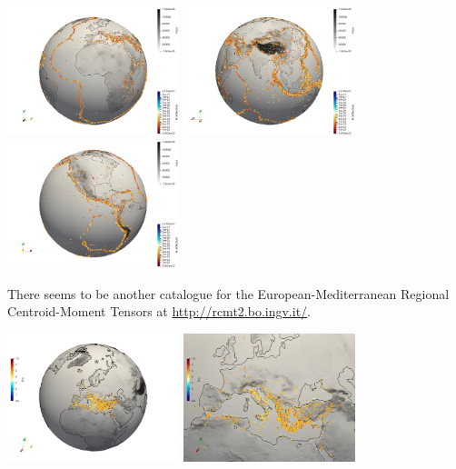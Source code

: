 \begin{center}
\includegraphics[width=5cm]{python_codes/fieldstone_134/images/visu1}
\includegraphics[width=5cm]{python_codes/fieldstone_134/images/visu2}
\includegraphics[width=5cm]{python_codes/fieldstone_134/images/visu3}
\end{center}


There seems to be another catalogue
for the European-Mediterranean Regional Centroid-Moment Tensors
at \url{http://rcmt2.bo.ingv.it/}.


\begin{center}
\includegraphics[width=5cm]{python_codes/fieldstone_134/images/visu5}
\includegraphics[width=5cm]{python_codes/fieldstone_134/images/visu4}
\end{center}


